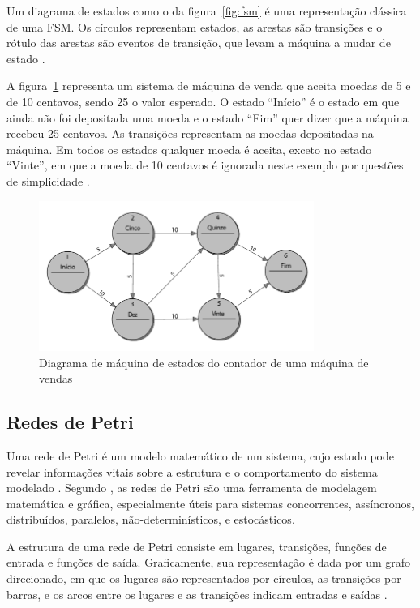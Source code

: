 Um diagrama de estados como o da figura~\ref{fig:fsm} é uma representação clássica de uma FSM. Os círculos representam estados, as arestas são transições e o rótulo das arestas são eventos de transição, que levam a máquina a mudar de estado \cite{marwedel:2010}.

A figura~\ref{fig:fsm_2} representa um sistema de máquina de venda que aceita moedas de 5 e de 10 centavos, sendo 25 o valor esperado. O estado ``Início'' é o estado em que ainda não foi depositada uma moeda e o estado ``Fim'' quer dizer que a máquina recebeu 25 centavos. As transições representam as moedas depositadas na máquina. Em todos os estados qualquer moeda é aceita, exceto no estado ``Vinte'', em que a moeda de 10 centavos é ignorada neste exemplo por questões de simplicidade \cite{wagner:2006}.

\begin{figure}[ht]
	\caption{\label{fig:fsm_2}Diagrama de máquina de estados do contador de uma máquina de vendas}
	\begin{center}
	    \includegraphics[width=0.8\textwidth]{resources/fsm_wagner}
	\end{center}
\end{figure}


\subsection{Redes de Petri}
Uma rede de Petri é um modelo matemático de um sistema, cujo estudo pode revelar informações vitais sobre a estrutura e o comportamento do sistema modelado \cite{peterson:1981}. Segundo , as redes de Petri são uma ferramenta de modelagem matemática e gráfica, especialmente úteis para sistemas concorrentes, assíncronos, distribuídos, paralelos, não-determinísticos, e estocásticos.

A estrutura de uma rede de Petri consiste em lugares, transições, funções de entrada e funções de saída. Graficamente, sua representação é dada por um grafo direcionado, em que os lugares são representados por círculos, as transições por barras, e os arcos entre os lugares e as transições indicam entradas e saídas \cite{peterson:1981}. %

